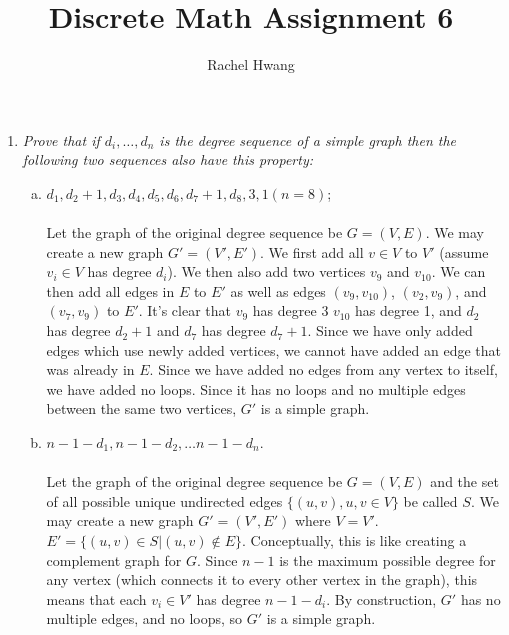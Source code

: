 \documentclass[a4paper]{article}
\title{Discrete Math Assignment 6}
\author{Rachel Hwang}
\begin{document}
\maketitle

\begin{enumerate}

\item \emph{Prove that if $d_i,\dots, d_n$ is the degree sequence of a simple graph then the following two sequences also have this property:}
\begin{enumerate}[(a)]
\item $d_1,d_2+1,d_3, d_4, d_5, d_6, d_7+1, d_8,3, 1 (n = 8)$; \\
\\
Let the graph of the original degree sequence be $G = (V,E)$. We may create a new graph $G' = (V',E')$. We first add all $v \in V$ to $V'$ (assume $v_i \in V$ has degree $d_i$). We then also add two vertices $v_9$ and $v_{10}$. We can then add all edges in $E$ to $E'$ as well as edges $(v_9, v_{10})$, $(v_2, v_9)$, and $(v_7, v_9)$ to $E'$. It's clear that $v_9$ has degree 3 $v_{10}$ has degree 1, and $d_2$ has degree $d_2+1$ and $d_7$ has degree $d_7+1$. Since we have only added edges which use newly added vertices, we cannot have added an edge that was already in $E$. Since we have added no edges from any vertex to itself, we have added no loops. Since it has no loops and no multiple edges between the same two vertices, $G'$ is a simple graph. \\

\item $n-1-d_1,n-1-d_2,\dots n-1-d_n$.  \\
\\
Let the graph of the original degree sequence be $G = (V,E)$ and the set of all possible unique undirected edges $\{(u,v), u,v \in V\}$ be called $S$. We may create a new graph $G' = (V',E')$ where $V = V'$. $E' = \{(u,v) \in S | (u,v) \notin E\}$. Conceptually, this is like creating a complement graph for $G$. Since $n-1$ is the maximum possible degree for any vertex (which connects it to every other vertex in the graph), this means that each $v_i \in V'$ has degree $n-1-d_i$. By construction, $G'$ has no multiple edges, and no loops, so $G'$ is a simple graph. \\ \\
\end{enumerate}



\end{enumerate}
\end{document}
